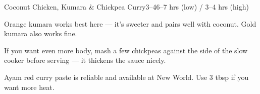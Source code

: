 \begin{recipebox}{Coconut Chicken, Kumara \& Chickpea Curry}{3--4}{6--7 hrs (low) / 3--4 hrs (high)}
\begin{notes}
Orange kumara works best here --- it's sweeter and pairs well with coconut. Gold kumara also works fine.

If you want even more body, mash a few chickpeas against the side of the slow cooker before serving --- it thickens the sauce nicely.

Ayam red curry paste is reliable and available at New World. Use 3 tbsp if you want more heat.
\end{notes}

\end{recipebox}